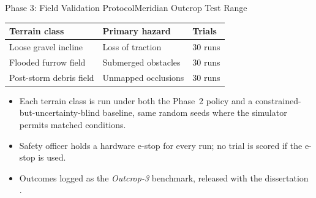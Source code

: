\begin{frame}{Phase 3: Field Validation Protocol}{Meridian Outcrop Test Range}
  \begin{table}
    \centering
    \small
    \begin{tabular}{lll}
      \toprule
      \textbf{Terrain class} & \textbf{Primary hazard} & \textbf{Trials} \\
      \midrule
      Loose gravel incline & Loss of traction & 30 runs \\
      Flooded furrow field & Submerged obstacles & 30 runs \\
      Post-storm debris field & Unmapped occlusions & 30 runs \\
      \bottomrule
    \end{tabular}
  \end{table}
  \begin{itemize}
    \item Each terrain class is run under both the Phase~2 policy and a
      constrained-but-uncertainty-blind baseline, same random seeds where
      the simulator permits matched conditions.
    \item Safety officer holds a hardware e-stop for every run; no trial is
      scored if the e-stop is used.
    \item Outcomes logged as the \emph{Outcrop-3} benchmark, released with
      the dissertation \cite{meridian2026benchmark}.
  \end{itemize}
\end{frame}
